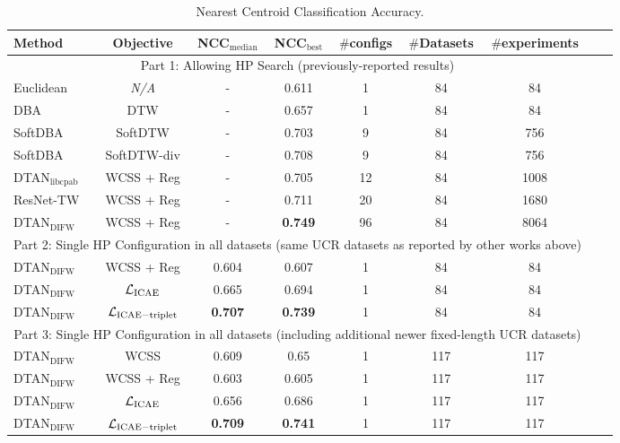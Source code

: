 \begin{table*}[t]
\caption{Nearest Centroid Classification Accuracy.}
\label{table:ncc}
\vskip 0.15in
\begin{center}
\begin{footnotesize}
\begin{sc}
\begin{tabular}{lcccccccr}
\toprule
Method & Objective & NCC$_{\mathrm{median}}$ & NCC$_{\mathrm{best}}$ & $\#$configs & $\#$Datasets & $\#$experiments \\
\midrule
\multicolumn{7}{c}{Part 1: Allowing HP Search (previously-reported results)} \\
\midrule
Euclidean            & \textit{N/A} & - & 0.611 & 1   & 84 & 84  \\
DBA~\cite{Petitjean:2011:global}                  & DTW          & - &0.657 & 1   & 84 & 84  \\
SoftDBA~\cite{cuturi:2017:soft}              & SoftDTW & - & 0.703 & 9   & 84 & 756 \\
SoftDBA~\cite{Blondel:2021:differentiable}          & SoftDTW-div & - & 0.708 & 9   & 84 & 756   \\
DTAN$_{\mathrm{libcpab}}$~\cite{Shapira:NIPS:2019:DTAN}     & WCSS + Reg & - & 0.705 & 12  & 84 & 1008 \\
ResNet-TW~\cite{huang:2021:residual}            & WCSS + Reg & - & 0.711 & 20  & 84 & 1680 \\
DTAN$_{\mathrm{DIFW}}$~\cite{Martinez:ICML:2022:closed}        & WCSS + Reg & - & \textbf{0.749} & 96  & 84 & 8064 \\
\midrule
\multicolumn{7}{c}{Part 2: Single HP Configuration in all datasets (same UCR datasets as reported by other works above)} \\ 
\midrule
DTAN$_{\mathrm{DIFW}}$~\cite{Shapira:NIPS:2019:DTAN, Martinez:ICML:2022:closed} & WCSS + Reg  & 0.604 & 0.607	 & 1   & 84 & 84 \\
DTAN$_{\mathrm{DIFW}}$~\cite{Shapira:ICML:2023:RFDTAN} &$\mathcal{L}_{\mathrm{ICAE}}$  & 0.665 & 0.694 & 1   & 84 & 84 \\
DTAN$_{\mathrm{DIFW}}$~\cite{Shapira:ICML:2023:RFDTAN} & $\mathcal{L}_{\mathrm{ICAE-triplet}}$ &  \textbf{0.707} & \textbf{0.739}  & 1 & 84 & 84  \\
\midrule
\multicolumn{7}{c}{Part 3: Single HP Configuration in all datasets (including additional newer fixed-length UCR datasets)} \\ 
\midrule
DTAN$_{\mathrm{DIFW}}$~\cite{Shapira:NIPS:2019:DTAN, Martinez:ICML:2022:closed} & WCSS & 0.609 & 0.65 & 1  & 117 & 117  \\
DTAN$_{\mathrm{DIFW}}$~\cite{Shapira:NIPS:2019:DTAN, Martinez:ICML:2022:closed} & WCSS + Reg & 0.603 & 0.605 & 1  & 117 & 117  \\
DTAN$_{\mathrm{DIFW}}$~\cite{Shapira:ICML:2023:RFDTAN}  & $\mathcal{L}_{\mathrm{ICAE}}$ & 0.656 & 0.686 & 1   & 117 &117 \\
DTAN$_{\mathrm{DIFW}}$~\cite{Shapira:ICML:2023:RFDTAN}  &$\mathcal{L}_{\mathrm{ICAE-triplet}}$ & \textbf{0.709} & \textbf{0.741}  & 1   & 117 & 117  \\


\end{tabular}
\end{sc}
\end{footnotesize}
\end{center}
\end{table*}
